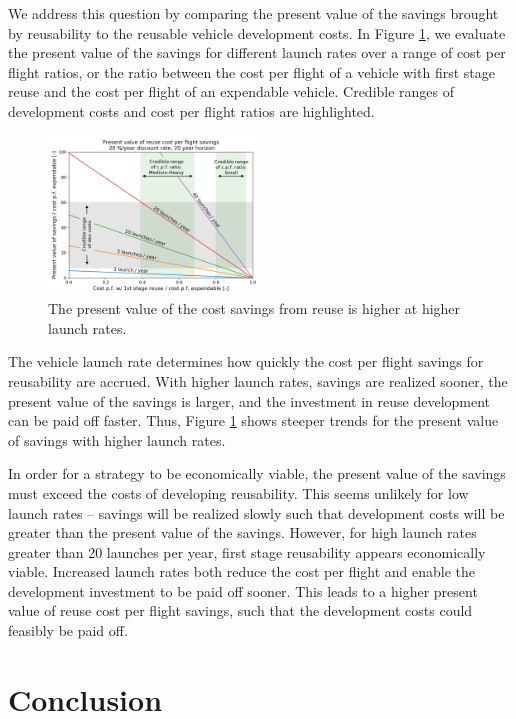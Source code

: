 \documentclass{iaf-iac}
\begin{document}
\begin{multicols}{2}
We address this question by comparing the present value of the savings brought by reusability to the reusable vehicle development costs. In Figure \ref{fig:reuse_npv}, we evaluate the present value of the savings for different launch rates over a range of cost per flight ratios, or the ratio between the cost per flight of a vehicle with first stage reuse and the cost per flight of an expendable vehicle. Credible ranges of development costs and cost per flight ratios are highlighted.

\begin{figure}[H]
    \centering
    \includegraphics[width=0.5\textwidth]{reuse_npv}
    \caption{\label{fig:reuse_npv} The present value of the cost savings from reuse is higher at higher launch rates.}
\end{figure}

The vehicle launch rate determines how quickly the cost per flight savings for reusability are accrued. With higher launch rates, savings are realized sooner, the present value of the savings is larger, and the investment in reuse development can be paid off faster. Thus, Figure \ref{fig:reuse_npv} shows steeper trends for the present value of savings with higher launch rates. 

In order for a strategy to be economically viable, the present value of the savings must exceed the costs of developing reusability. This seems unlikely for low launch rates -- savings will be realized slowly such that development costs will be greater than the present value of the savings. However, for high launch rates greater than 20 launches per year, first stage reusability appears economically viable. Increased launch rates both reduce the cost per flight and enable the development investment to be paid off sooner. This leads to a higher present value of reuse cost per flight savings, such that the development costs could feasibly be paid off.


\section{Conclusion}


\end{multicols}
\end{document}
